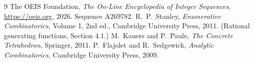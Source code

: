 \documentclass[11pt,a4paper]{article}
\theoremstyle{plain}
\theoremstyle{definition}
\begin{document}
\begin{thebibliography}{9}
 The OEIS Foundation, \emph{The On-Line Encyclopedia of Integer
Sequences}, \url{https://oeis.org}, 2026. Sequence A269782.
 R.~P.~Stanley, \emph{Enumerative Combinatorics}, Volume 1, 2nd ed.,
Cambridge University Press, 2011. (Rational generating functions, Section 4.1.)
 M.~Kauers and P.~Paule, \emph{The Concrete Tetrahedron}, Springer, 2011.
 P.~Flajolet and R.~Sedgewick, \emph{Analytic Combinatorics}, Cambridge
University Press, 2009.
\end{thebibliography}
\end{document}
